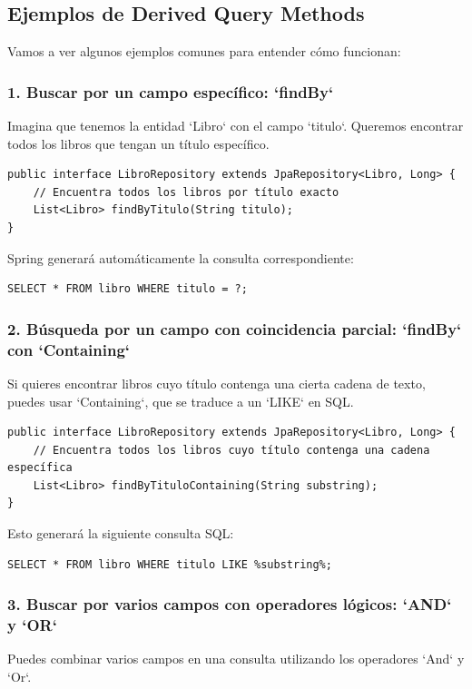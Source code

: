 \documentclass[11pt]{article}
\begin{document}
\subsection{Ejemplos de Derived Query Methods}
\label{sec:org3de36d0}
Vamos a ver algunos ejemplos comunes para entender cómo funcionan:

\subsubsection{1. Buscar por un campo específico: `findBy`}
\label{sec:org07ffb25}
Imagina que tenemos la entidad `Libro` con el campo `titulo`. Queremos encontrar todos los libros que tengan un título específico.

\begin{verbatim}
public interface LibroRepository extends JpaRepository<Libro, Long> {
    // Encuentra todos los libros por título exacto
    List<Libro> findByTitulo(String titulo);
}
\end{verbatim}

Spring generará automáticamente la consulta correspondiente:

\begin{verbatim}
SELECT * FROM libro WHERE titulo = ?;
\end{verbatim}

\subsubsection{2. Búsqueda por un campo con coincidencia parcial: `findBy` con `Containing`}
\label{sec:orgbfb348b}
Si quieres encontrar libros cuyo título contenga una cierta cadena de texto, puedes usar `Containing`, que se traduce a un `LIKE` en SQL.

\begin{verbatim}
public interface LibroRepository extends JpaRepository<Libro, Long> {
    // Encuentra todos los libros cuyo título contenga una cadena específica
    List<Libro> findByTituloContaining(String substring);
}
\end{verbatim}

Esto generará la siguiente consulta SQL:

\begin{verbatim}
SELECT * FROM libro WHERE titulo LIKE %substring%;
\end{verbatim}

\subsubsection{3. Buscar por varios campos con operadores lógicos: `AND` y `OR`}
\label{sec:org1799228}
Puedes combinar varios campos en una consulta utilizando los operadores `And` y `Or`.
\end{document}
